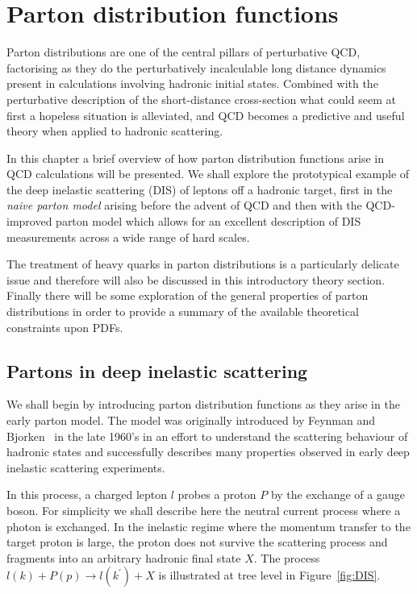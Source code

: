 \chapter{\label{chapter1} Parton distribution functions} 
Parton distributions are one of the central pillars of perturbative QCD,
factorising as they do the perturbatively incalculable long distance dynamics
present in calculations involving hadronic initial states. Combined with the
perturbative description of the short-distance cross-section what could seem at
first a hopeless situation is alleviated, and QCD becomes a predictive and
useful theory when applied to hadronic scattering.

In this chapter a brief overview of how parton distribution functions arise in
QCD calculations will be presented.  We shall explore the prototypical example
of the deep inelastic scattering (DIS) of leptons off a hadronic target, first
in the \emph{naive parton model} arising before the advent of QCD and then with
the QCD-improved parton model which allows for an excellent description of DIS
measurements across a wide range of hard scales.

The treatment of heavy quarks in parton distributions is a particularly delicate
issue and therefore will also be discussed in this introductory theory section.
Finally there will be some exploration of the general properties of parton
distributions in order to provide a summary of the available theoretical
constraints upon PDFs.

\section{Partons in deep inelastic scattering}
We shall begin by introducing parton distribution functions as they arise in the
early parton model. The model was originally introduced by Feynman and
Bjorken~\cite{feynman1,Feynmanparton,feynmanparton2, Bjorken:1968dy} in the late
1960's in an effort to understand the scattering behaviour of hadronic states
and successfully describes many properties observed in early deep inelastic
scattering experiments.

In this process, a charged lepton $l$ probes a proton $P$ by the exchange of a
gauge boson. For simplicity we shall describe here the neutral current process
where a photon is exchanged. In the inelastic regime where the momentum transfer
to the target proton is large, the proton does not survive the scattering
process and fragments into an arbitrary hadronic final state $X$. The process
$l(k) + P(p) \to l(k^\prime) + X$ is illustrated at tree level in Figure~\ref{fig:DIS}. 

